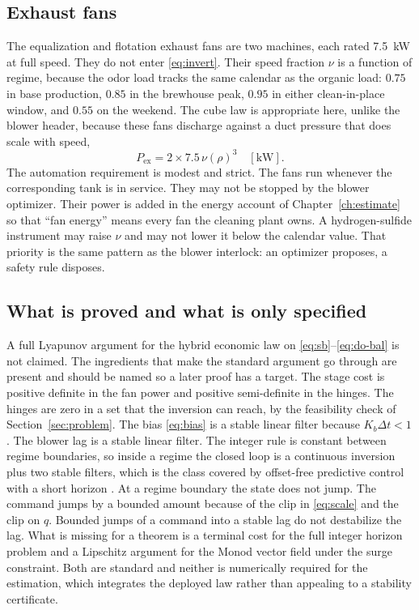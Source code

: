 \subsection{Exhaust fans}

The equalization and flotation exhaust fans are two machines, each rated \SI{7.5}{\kilo\watt} at full speed. They do not enter \eqref{eq:invert}. Their speed fraction $\nu$ is a function of regime, because the odor load tracks the same calendar as the organic load: $0.75$ in base production, $0.85$ in the brewhouse peak, $0.95$ in either clean-in-place window, and $0.55$ on the weekend. The cube law is appropriate here, unlike the blower header, because these fans discharge against a duct pressure that does scale with speed,
\begin{equation}
\label{eq:exhaust}
P_{\mathrm{ex}}
=
2\times 7.5\,
\nu(\rho)^{3}
\quad[\mathrm{kW}].
\end{equation}
The automation requirement is modest and strict. The fans run whenever the corresponding tank is in service. They may not be stopped by the blower optimizer. Their power is added in the energy account of Chapter~\ref{ch:estimate} so that ``fan energy'' means every fan the cleaning plant owns. A hydrogen-sulfide instrument may raise $\nu$ and may not lower it below the calendar value. That priority is the same pattern as the blower interlock: an optimizer proposes, a safety rule disposes.

\subsection{What is proved and what is only specified}

A full Lyapunov argument for the hybrid economic law on \eqref{eq:sb}--\eqref{eq:do-bal} is not claimed. The ingredients that make the standard argument go through are present and should be named so a later proof has a target. The stage cost is positive definite in the fan power and positive semi-definite in the hinges. The hinges are zero in a set that the inversion can reach, by the feasibility check of Section~\ref{sec:problem}. The bias \eqref{eq:bias} is a stable linear filter because $K_{b}\Delta t<1$. The blower lag is a stable linear filter. The integer rule is constant between regime boundaries, so inside a regime the closed loop is a continuous inversion plus two stable filters, which is the class covered by offset-free predictive control with a short horizon \cite{mayne2000mpc,pannocchia2003offset,rawlings2017mpc}. At a regime boundary the state does not jump. The command jumps by a bounded amount because of the clip in \eqref{eq:scale} and the clip on $q$. Bounded jumps of a command into a stable lag do not destabilize the lag. What is missing for a theorem is a terminal cost for the full integer horizon problem and a Lipschitz argument for the Monod vector field under the surge constraint. Both are standard and neither is numerically required for the estimation, which integrates the deployed law rather than appealing to a stability certificate.


